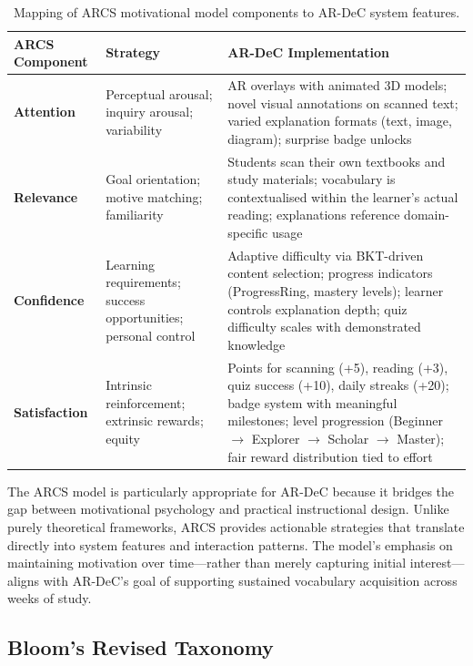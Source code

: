 \begin{table}[htbp]
\centering
\caption{Mapping of ARCS motivational model components to AR-DeC system features.}
\label{tab:arcs_mapping}
\begin{tabular}{p{2.2cm} p{4cm} p{6.5cm}}
\toprule
\textbf{ARCS Component} & \textbf{Strategy} & \textbf{AR-DeC Implementation} \\
\midrule
\textbf{Attention} &
Perceptual arousal; inquiry arousal; variability &
AR overlays with animated 3D models; novel visual annotations on scanned text; varied explanation formats (text, image, diagram); surprise badge unlocks \\
\addlinespace
\textbf{Relevance} &
Goal orientation; motive matching; familiarity &
Students scan their own textbooks and study materials; vocabulary is contextualised within the learner's actual reading; explanations reference domain-specific usage \\
\addlinespace
\textbf{Confidence} &
Learning requirements; success opportunities; personal control &
Adaptive difficulty via BKT-driven content selection; progress indicators (ProgressRing, mastery levels); learner controls explanation depth; quiz difficulty scales with demonstrated knowledge \\
\addlinespace
\textbf{Satisfaction} &
Intrinsic reinforcement; extrinsic rewards; equity &
Points for scanning (+5), reading (+3), quiz success (+10), daily streaks (+20); badge system with meaningful milestones; level progression (Beginner $\rightarrow$ Explorer $\rightarrow$ Scholar $\rightarrow$ Master); fair reward distribution tied to effort \\
\bottomrule
\end{tabular}
\end{table}

The ARCS model is particularly appropriate for AR-DeC because it bridges the gap between motivational psychology and practical instructional design. Unlike purely theoretical frameworks, ARCS provides actionable strategies that translate directly into system features and interaction patterns. The model's emphasis on maintaining motivation over time---rather than merely capturing initial interest---aligns with AR-DeC's goal of supporting sustained vocabulary acquisition across weeks of study.

\subsection{Bloom's Revised Taxonomy}
\label{subsec:blooms}

